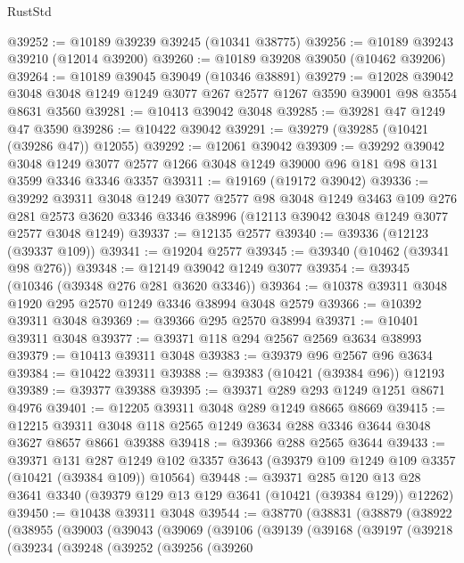 \begin{lexlean}{RustStd}
\begin{coremodule}
@39252 := @10189 @39239 @39245 (@10341 @38775)
@39256 := @10189 @39243 @39210 (@12014 @39200)
@39260 := @10189 @39208 @39050 (@10462 @39206)
@39264 := @10189 @39045 @39049 (@10346 @38891)
@39279 := @12028
    @39042
    @3048
    @3048
    @1249
    @1249
    @3077
    @267
    @2577
    @1267
    @3590
    @39001
    @98
    @3554
    @8631
    @3560
@39281 := @10413 @39042 @3048
@39285 := @39281 @47 @1249 @47 @3590
@39286 := @10422 @39042
@39291 := @39279 (@39285 (@10421 (@39286 @47)) @12055)
@39292 := @12061 @39042
@39309 := @39292
    @39042
    @3048
    @1249
    @3077
    @2577
    @1266
    @3048
    @1249
    @39000
    @96
    @181
    @98
    @131
    @3599
    @3346
    @3346
    @3357
@39311 := @19169 (@19172 @39042)
@39336 := @39292
    @39311
    @3048
    @1249
    @3077
    @2577
    @98
    @3048
    @1249
    @3463
    @109
    @276
    @281
    @2573
    @3620
    @3346
    @3346
    @38996
    (@12113 @39042 @3048 @1249 @3077 @2577 @3048 @1249)
@39337 := @12135 @2577
@39340 := @39336 (@12123 (@39337 @109))
@39341 := @19204 @2577
@39345 := @39340 (@10462 (@39341 @98 @276))
@39348 := @12149 @39042 @1249 @3077
@39354 := @39345 (@10346 (@39348 @276 @281 @3620 @3346))
@39364 := @10378 @39311 @3048 @1920 @295 @2570 @1249 @3346 @38994 @3048 @2579
@39366 := @10392 @39311 @3048
@39369 := @39366 @295 @2570 @38994
@39371 := @10401 @39311 @3048
@39377 := @39371 @118 @294 @2567 @2569 @3634 @38993
@39379 := @10413 @39311 @3048
@39383 := @39379 @96 @2567 @96 @3634
@39384 := @10422 @39311
@39388 := @39383 (@10421 (@39384 @96)) @12193
@39389 := @39377 @39388
@39395 := @39371 @289 @293 @1249 @1251 @8671 @4976
@39401 := @12205 @39311 @3048 @289 @1249 @8665 @8669
@39415 := @12215 @39311 @3048 @118 @2565 @1249 @3634 @288 @3346 @3644 @3048 @3627 @8657 @8661 @39388
@39418 := @39366 @288 @2565 @3644
@39433 := @39371
    @131
    @287
    @1249
    @102
    @3357
    @3643
    (@39379 @109 @1249 @109 @3357 (@10421 (@39384 @109)) @10564)
@39448 := @39371
    @285
    @120
    @13
    @28
    @3641
    @3340
    (@39379 @129 @13 @129 @3641 (@10421 (@39384 @129)) @12262)
@39450 := @10438 @39311 @3048
@39544 := @38770
    (@38831
      (@38879
        (@38922
          (@38955
            (@39003
              (@39043
                (@39069
                  (@39106
                    (@39139
                      (@39168
                        (@39197
                          (@39218
                            (@39234
                              (@39248
                                (@39252
                                  (@39256
                                    (@39260

\end{coremodule}
\end{lexlean}
